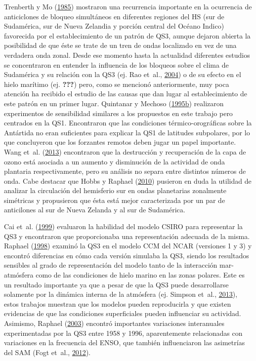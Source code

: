 \documentclass[spanish,a4paper,12pt]{book}
\begin{document}
Trenberth y Mo (\protect\hyperlink{ref-Trenberth1985}{1985}) mostraron
una recurrencia importante en la ocurrencia de anticiclones de bloqueo
simultáneos en diferentes regiones del HS (sur de Sudamérica, sur de
Nueva Zelandia y porción central del Océano Indico) favorecida por el
establecimiento de un patrón de QS3, aunque dejaron abierta la
posibilidad de que éste se trate de un tren de ondas localizado en vez
de una verdadera onda zonal. Desde ese momento hasta la actualidad
diferentes estudios se concentraron en entender la influencia de los
bloqueos sobre el clima de Sudamérica y su relación con la QS3 (ej. Rao
et~al., \protect\hyperlink{ref-Rao2004}{2004}) o de su efecto en el
hielo marítimo (ej. {\textbf{???}}) pero, como se mencionó
anteriormente, muy poca atención ha recibido el estudio de las causas
que dan lugar al establecimiento de este patrón en un primer lugar.
Quintanar y Mechoso
(\protect\hyperlink{ref-Quintanar1995}{1995}\protect\hyperlink{ref-Quintanar1995}{b})
realizaron experimentos de sensibilidad similares a los propuestos en
este trabajo pero centrados en la QS1. Encontraron que las condiciones
térmico-orográficas sobre la Antártida no eran suficientes para explicar
la QS1 de latitudes subpolares, por lo que concluyeron que los forzantes
remotos deben jugar un papel importante. Wang et~al.
(\protect\hyperlink{ref-Wang2013}{2013}) encontraron que la destrucción
y recuperación de la capa de ozono está asociada a un aumento y
disminución de la actividad de onda plantaria respectivamente, pero su
análisis no separa entre distintos números de onda. Cabe destacar que
Hobbs y Raphael (\protect\hyperlink{ref-Hobbs2010}{2010}) pusieron en
duda la utilidad de analizar la circulación del hemisferio sur en ondas
planetarias zonalmente simétricas y propusieron que ésta está mejor
caracterizada por un par de anticilones al sur de Nueva Zelanda y al sur
de Sudamérica.

Cai et~al. (\protect\hyperlink{ref-Cai1999}{1999}) evaluaron la
habilidad del modelo CSIRO para representar la QS3 y encontraron que
proporcionaba una representación adecuada de la misma. Raphael
(\protect\hyperlink{ref-Raphael1998}{1998}) examinó la QS3 en el modelo
CCM del NCAR (versiones 1 y 3) y encontró diferencias en cómo cada
versión simulaba la QS3, siendo los resultados sensibles al grado de
representación del modelo tanto de la interacción mar-atmósfera como de
las condiciones de hielo marino en las zonas polares. Este es un
resultado importante ya que a pesar de que la QS3 puede desarrollarse
solamente por la dinámica interna de la atmósfera (ej. Simpson et~al.,
\protect\hyperlink{ref-Simpson2013}{2013}), estos trabajos muestran que
los modelos pueden reproducirla y que existen evidencias de que las
condiciones superficiales pueden influenciar su actividad. Asimismo,
Raphael (\protect\hyperlink{ref-Raphael2003}{2003}) encontró importantes
variaciones interanuales experimentadas por la QS3 entre 1958 y 1996,
aparentemente relacionadas con variaciones en la frecuencia del ENSO,
que también influenciaron las asimetrías del SAM (Fogt et~al.,
\protect\hyperlink{ref-Fogt2012}{2012}).
\end{document}
